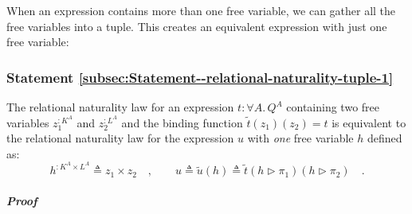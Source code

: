 When an expression contains more than one free variable, we can gather
all the free variables into a tuple. This creates an equivalent expression
with just one free variable:

\subsubsection{Statement \label{subsec:Statement--relational-naturality-tuple-1}\ref{subsec:Statement--relational-naturality-tuple-1} }

The relational naturality law for an expression $t:\forall A.\,Q^{A}$
containing two free variables $z_{1}^{:K^{A}}$ and $z_{2}^{:L^{A}}$
and the binding function $\tilde{t}(z_{1})(z_{2})=t$ is equivalent
to the relational naturality law for the expression $u$ with \emph{one}
free variable $h$ defined as:
\[
h^{:K^{A}\times L^{A}}\triangleq z_{1}\times z_{2}\quad,\quad\quad u\triangleq\tilde{u}(h)\triangleq\tilde{t}(h\triangleright\pi_{1})(h\triangleright\pi_{2})\quad.
\]


\subparagraph{Proof}

